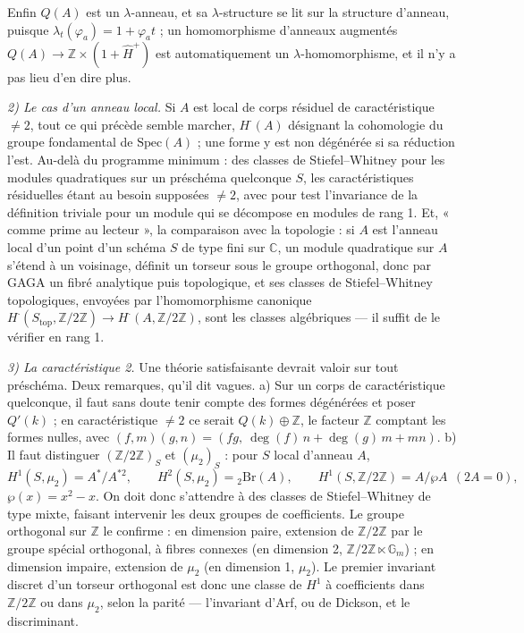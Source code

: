\documentclass[11pt,a4paper]{article}
\begin{document}
Enfin $Q(A)$ est un $\lambda$-anneau, et sa $\lambda$-structure se lit sur la
structure d'anneau, puisque $\lambda_t(\varphi_a) = 1 + \varphi_a t$ ; un
homomorphisme d'anneaux augmentés $Q(A) \to \mathbb{Z} \times (1 + \hat H^{+})$ est
automatiquement un $\lambda$-homomorphisme, et il n'y a pas lieu d'en dire plus.

\emph{2) Le cas d'un anneau local.} Si $A$ est local de corps résiduel de
caractéristique $\neq 2$, tout ce qui précède semble marcher, $H^{\cdot}(A)$
désignant la cohomologie du groupe fondamental de $\mathrm{Spec}(A)$ ; une forme
y est non dégénérée si sa réduction l'est. Au-delà du programme minimum : des
classes de Stiefel--Whitney pour les modules quadratiques sur un préschéma
quelconque $S$, les caractéristiques résiduelles étant au besoin supposées
$\neq 2$, avec pour test l'invariance de la définition triviale pour un module
qui se décompose en modules de rang 1. Et, « comme prime au lecteur », la
comparaison avec la topologie : si $A$ est l'anneau local d'un point d'un
schéma $S$ de type fini sur $\mathbb{C}$, un module quadratique sur $A$ s'étend à un
voisinage, définit un torseur sous le groupe orthogonal, donc par GAGA un fibré
analytique puis topologique, et ses classes de Stiefel--Whitney topologiques,
envoyées par l'homomorphisme canonique $H^{\cdot}(S_{\mathrm{top}},
\mathbb{Z}/2\mathbb{Z}) \to H^{\cdot}(A, \mathbb{Z}/2\mathbb{Z})$, sont les classes
algébriques — il suffit de le vérifier en rang 1.

\emph{3) La caractéristique 2.} Une théorie satisfaisante devrait valoir sur tout
préschéma. Deux remarques, qu'il dit vagues. a) Sur un corps de caractéristique
quelconque, il faut sans doute tenir compte des formes dégénérées et poser
$Q'(k)$ ; en caractéristique $\neq 2$ ce serait $Q(k) \oplus \mathbb{Z}$, le facteur
$\mathbb{Z}$ comptant les formes nulles, avec
$(f,m)(g,n) = (fg,\ \deg(f)\,n + \deg(g)\,m + mn)$. b) Il faut distinguer
$(\mathbb{Z}/2\mathbb{Z})_S$ et $(\mu_2)_S$ : pour $S$ local d'anneau $A$,
\[
H^1(S, \mu_2) = A^{*}/A^{*2}, \qquad H^2(S, \mu_2) = {}_2\mathrm{Br}(A), \qquad
H^1(S, \mathbb{Z}/2\mathbb{Z}) = A/\wp A \ \ (2A = 0),
\]
$\wp(x) = x^2 - x$. On doit donc s'attendre à des classes de Stiefel--Whitney de
type mixte, faisant intervenir les deux groupes de coefficients. Le groupe
orthogonal sur $\mathbb{Z}$ le confirme : en dimension paire, extension de
$\mathbb{Z}/2\mathbb{Z}$ par le groupe spécial orthogonal, à fibres connexes (en
dimension 2, $\mathbb{Z}/2\mathbb{Z} \ltimes \mathbb{G}_m$) ; en dimension impaire,
extension de $\mu_2$ (en dimension 1, $\mu_2$). Le premier invariant discret d'un
torseur orthogonal est donc une classe de $H^1$ à coefficients dans
$\mathbb{Z}/2\mathbb{Z}$ ou dans $\mu_2$, selon la parité — l'invariant d'Arf, ou de
Dickson, et le discriminant.
\end{document}
